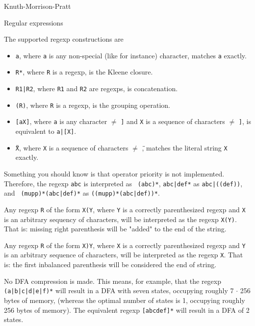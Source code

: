 
\begin{algorithm}{Knuth-Morrison-Pratt}
\end{algorithm}

\begin{algorithm}{Regular expressions}


The supported regexp constructions are
\begin{itemize}
 \item{{\tt a}}, where {\tt a} is any non-special (like {\tt *} for instance) character, matches {\tt a} exactly.
 \item{{\tt R*}}, where {\tt R} is a regexp, is the Kleene closure.
 \item{{\tt R1|R2}}, where {\tt R1} and {\tt R2} are regexps, is concatenation.
 \item{{\tt (R)}}, where {\tt R} is a regexp, is the grouping operation.
 \item{{\tt [aX]}}, where {\tt a} is any character $\neq$ {\tt ]} and {\tt X} is a sequence of characters $\neq$ {\tt ]}, is equivalent to {\tt a|[X]}.
 \item{{\tt \"{}X\"{}}}, where {\tt X} is a sequence of characters $\neq$ {\tt \"{}}, matches the literal string {\tt X} exactly.
\end{itemize}

Something you should know is that operator priority is not
implemented. Therefore, the regexp {\tt abc\*} is interpreted as {\tt
(abc)*}, {\tt abc|def*} as {\tt abc|((def)\*)}, and {\tt
(mupp)*(abc|def)*} as {\tt ((mupp)*(abc|def))*}.

Any regexp {\tt R} of the form {\tt X(Y}, where {\tt Y} is a correctly
parenthesized regexp and {\tt X} is an arbitrary sequency of characters,
will be interpreted as the regexp {\tt X(Y)}. That is: missing right
parenthesis will be "added" to the end of the string.

Any regexp {\tt R} of the form {\tt X)Y}, where {\tt X} is a correctly
parenthesized regexp and {\tt Y} is an arbitrary sequence of
characters, will be interpreted as the regexp {\tt X}. That is: the
first inbalanced parenthesis will be considered the end of string.

No DFA compression is made. This means, for example, that the regexp
{\tt (a|b|c|d|e|f)*} will result in a DFA with seven states, occupying
roughly 7 $\cdot$ 256 bytes of memory, (whereas the optimal number of states
is 1, occupying roughly 256 bytes of memory). The equivalent regexp
{\tt [abcdef]*} will result in a DFA of 2 states.

\end{algorithm}